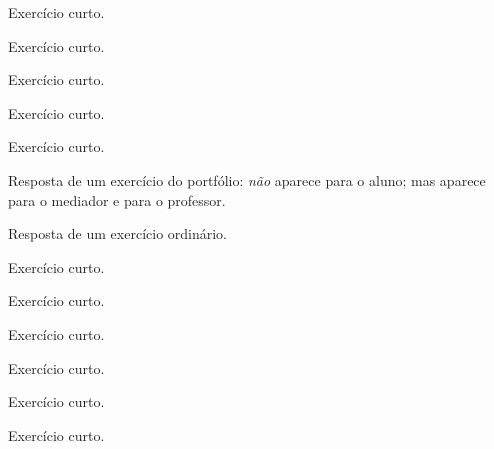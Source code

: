 \documentclass[a4paper]{article}
\begin{document}
\begin{exercicio}
  Exercício curto.
\end{exercicio}

\begin{exercicio}
  Exercício curto.
\end{exercicio}

\begin{exercicio}
  Exercício curto.
\end{exercicio}

\begin{exercicio}
  Exercício curto.
\end{exercicio}

\begin{exercicio}
  Exercício curto.
\end{exercicio}

\begin{respostas}
  \begin{exercicio*}
    Resposta de um exercício do portfólio:
    \emph{não} aparece para o aluno;
    mas aparece para o mediador e para o professor.
  \end{exercicio*}
  
  \begin{exercicio}
    Resposta de um exercício ordinário.
  \end{exercicio}
  
  \begin{exercicio}
    \lipsum[1-18]
  \end{exercicio}
  
  \begin{exercicio}
    Exercício curto.
  \end{exercicio}

  \begin{exercicio}
    Exercício curto.
  \end{exercicio}

  \begin{exercicio}
    Exercício curto.
  \end{exercicio}

  \begin{exercicio}
    Exercício curto.
  \end{exercicio}

  \begin{exercicio}
    Exercício curto.
  \end{exercicio}

  \begin{exercicio}
    Exercício curto.
  \end{exercicio}
\end{respostas}
\end{document}
